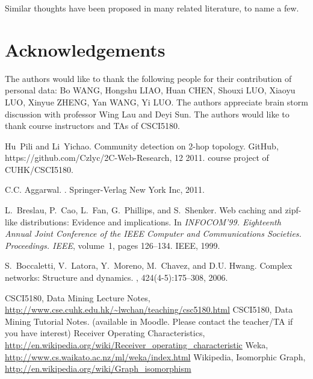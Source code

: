 \documentclass[11pt,a4paper]{article}
\begin{document}
Similar thoughts have been proposed in many related literature, to name 
a few\cite{boccaletti2006complex,aggarwal2011social}. 

\section*{Acknowledgements}

The authors would like to thank the following people for their contribution of 
personal data: 
Bo WANG, Hongshu LIAO, Huan CHEN, Shouxi LUO, 
Xiaoyu LUO, Xinyue ZHENG, Yan WANG, Yi LUO. 
The authors appreciate brain storm discussion with professor Wing Lau 
and Deyi Sun. 
The authors would like to thank course instructors and TAs of CSCI5180. 



%
%
%


\begin{thebibliography}{99}

Hu~Pili and Li~Yichao.
\newblock Community detection on 2-hop topology.
\newblock GitHub, https://github.com/Czlyc/2C-Web-Research, 12 2011.
\newblock course project of CUHK/CSCI5180.

C.C. Aggarwal.
.
\newblock Springer-Verlag New York Inc, 2011.

L.~Breslau, P.~Cao, L.~Fan, G.~Phillips, and S.~Shenker.
\newblock Web caching and zipf-like distributions: Evidence and implications.
\newblock In {\em INFOCOM'99. Eighteenth Annual Joint Conference of the IEEE
  Computer and Communications Societies. Proceedings. IEEE}, volume~1, pages
  126--134. IEEE, 1999.

S.~Boccaletti, V.~Latora, Y.~Moreno, M.~Chavez, and D.U. Hwang.
\newblock Complex networks: Structure and dynamics.
, 424(4-5):175--308, 2006.


	 CSCI5180, Data Mining Lecture Notes, 
		\url{http://www.cse.cuhk.edu.hk/~lwchan/teaching/csc5180.html}
	 CSCI5180, Data Mining Tutorial Notes. 
		(available in Moodle. Please contact the teacher/TA if you have 
		interest)
	 Receiver Operating Characteristics, 
		\url{http://en.wikipedia.org/wiki/Receiver_operating_characteristic}
	 Weka, 
		\url{http://www.cs.waikato.ac.nz/ml/weka/index.html}
	 Wikipedia, Isomorphic Graph, 
		\url{http://en.wikipedia.org/wiki/Graph_isomorphism}
\end{thebibliography}
\end{document}
